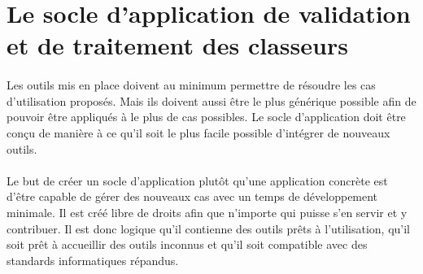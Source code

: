 \section{Le socle d'application de validation et de traitement des classeurs}
\label{sec:spreadsheet-framework}

\paragraph{}
Les outils mis en place doivent au minimum permettre de résoudre les cas d'utilisation proposés.
Mais ils doivent aussi être le plus générique possible afin de pouvoir être appliqués à le plus de cas possibles.
Le socle d'application doit être conçu de manière à ce qu'il soit le plus facile possible d'intégrer de nouveaux outils.

\paragraph{}
Le but de créer un socle d'application plutôt qu'une application concrète est d'être capable de gérer des nouveaux cas avec un temps de développement minimale.
Il est créé libre de droits afin que n'importe qui puisse s'en servir et y contribuer.
Il est donc logique qu'il contienne des outils prêts à l'utilisation, qu'il soit prêt à accueillir des outils inconnus et qu'il soit compatible avec des standards informatiques répandus.








